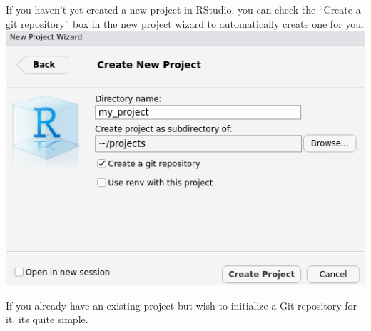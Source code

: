 \documentclass[
]{book}
\begin{document}
If you haven't yet created a new project in RStudio, you can check the ``Create a git repository'' box in the new project wizard to automatically create one for you.
\includegraphics{images/02-newgit_1.png}

If you already have an existing project but wish to initialize a Git repository for it, its quite simple.
\end{document}
